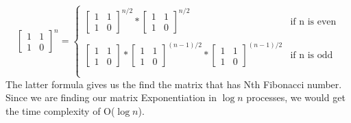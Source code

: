 \documentclass[12pt]{article}
\begin{document}
\begin{equation}
    \begin{bmatrix}
        1 & 1  \\
        1 & 0
    \end{bmatrix}^{n} =
  \begin{cases}
    \begin{bmatrix}
        1 & 1  \\
        1 & 0
    \end{bmatrix}^{n/2} 
    * 
    \begin{bmatrix}
        1 & 1  \\
        1 & 0
    \end{bmatrix}^{n/2} & \text{if n is even} \\\\
    \begin{bmatrix}
        1 & 1  \\
        1 & 0
    \end{bmatrix}
    *
    \begin{bmatrix}
        1 & 1  \\
        1 & 0
    \end{bmatrix}^{(n-1)/2} 
    * 
    \begin{bmatrix}
        1 & 1  \\
        1 & 0
    \end{bmatrix}^{(n-1)/2}& \text{if n is odd} \\\\
  \end{cases}
\end{equation}
The latter formula gives us the find the matrix that has Nth Fibonacci number. Since we are finding our matrix Exponentiation in $\log{n}$ processes, we would get the time complexity of O($\log{n}$).
\clearpage
\end{document}
